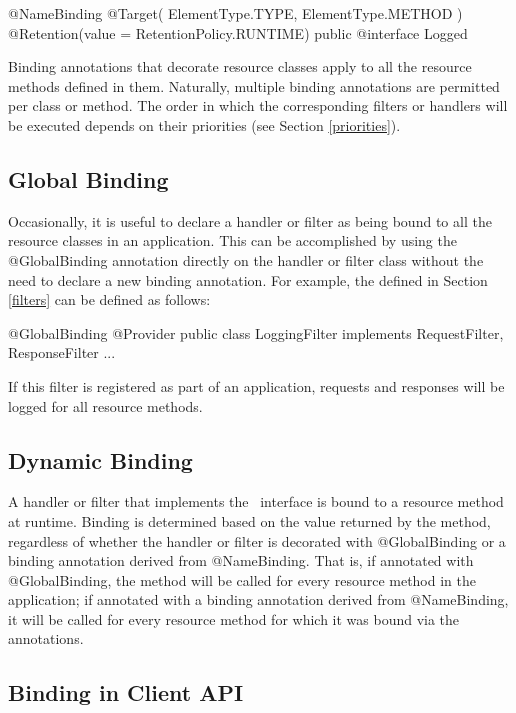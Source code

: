 \begin{listing}{1}
@NameBinding
@Target({ ElementType.TYPE, ElementType.METHOD })
@Retention(value = RetentionPolicy.RUNTIME)
public @interface Logged { }
\end{listing}

Binding annotations that decorate resource classes apply to all the resource methods defined in them. Naturally, multiple binding annotations are permitted per class or method. The order in which the corresponding filters or handlers will be executed depends on their priorities (see Section \ref{priorities}).

\subsection{Global Binding}

Occasionally, it is useful to declare a handler or filter as being bound to all the resource classes in an application. This can be accomplished by using the @GlobalBinding annotation directly on the handler or filter class without the need to declare a new binding annotation. For example, the  defined in Section \ref{filters} can be defined as follows:

\begin{listing}{1}
@GlobalBinding
@Provider
public class LoggingFilter implements RequestFilter, ResponseFilter {
    ...
}
\end{listing}

If this filter is registered as part of an application, requests and responses will be logged for all resource methods. 

\subsection{Dynamic Binding}

A handler or filter that implements the \DynamicBinding\ interface is bound to a resource method at runtime. Binding is determined based on the value returned by the  method, regardless of whether the handler or filter is decorated with @GlobalBinding or a binding annotation derived from @NameBinding. That is, if annotated with @GlobalBinding, the  method will be called for every resource method in the application; if annotated with a binding annotation derived from @NameBinding, it will be called for every resource method for which it was bound via the annotations.

\subsection{Binding in Client API}
\label{binding_in_client_api}

